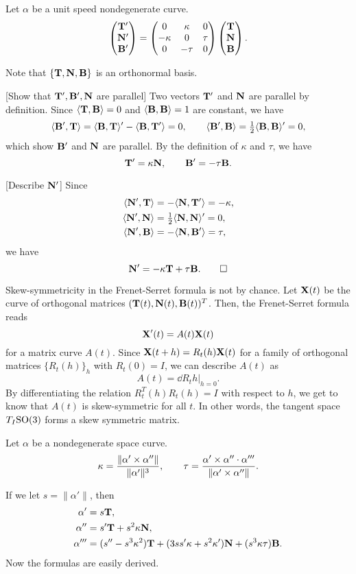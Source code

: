 \documentclass{../exp}
\def\a{\alpha}
\begin{document}
\begin{thm}
Let $\a$ be a unit speed nondegenerate curve.
\[\begin{pmatrix}\mathbf{T}'\\\mathbf{N}'\\\mathbf{B}'\end{pmatrix}=\begin{pmatrix}0&\kappa&0\\-\kappa&0&\tau\\0&-\tau&0\end{pmatrix}\begin{pmatrix}\mathbf{T}\\\mathbf{N}\\\mathbf{B}\end{pmatrix}.\]
\end{thm}
\begin{pf}
Note that $\{\mathbf{T},\mathbf{N},\mathbf{B}\}$ is an orthonormal basis.

[Show that $\mathbf{T}',\mathbf{B}',\mathbf{N}$ are parallel]
Two vectors $\mathbf{T}'$ and $\mathbf{N}$ are parallel by definition.
Since $\langle\mathbf{T},\mathbf{B}\rangle=0$ and $\langle\mathbf{B},\mathbf{B}\rangle=1$ are constant, we have
\[\langle\mathbf{B}',\mathbf{T}\rangle=\langle\mathbf{B},\mathbf{T}\rangle'-\langle\mathbf{B},\mathbf{T}'\rangle=0,\qquad\langle\mathbf{B}',\mathbf{B}\rangle=\tfrac12\langle\mathbf{B},\mathbf{B}\rangle'=0,\]
which show $\mathbf{B}'$ and $\mathbf{N}$ are parallel.
By the definition of $\kappa$ and $\tau$, we have
\[\mathbf{T}'=\kappa\mathbf{N},\qquad\mathbf{B}'=-\tau\mathbf{B}.\]

[Describe $\mathbf{N}'$]
Since
\begin{align*}
\langle\mathbf{N}',\mathbf{T}\rangle&=-\langle\mathbf{N},\mathbf{T}'\rangle=-\kappa,\\
\langle\mathbf{N}',\mathbf{N}\rangle&=\tfrac12\langle\mathbf{N},\mathbf{N}\rangle'=0,\\
\langle\mathbf{N}',\mathbf{B}\rangle&=-\langle\mathbf{N},\mathbf{B}'\rangle=\tau,
\end{align*}
we have
\[\mathbf{N}'=-\kappa\mathbf{T}+\tau\mathbf{B}.\qedhere\]
\end{pf}
\begin{rmk}
Skew-symmetricity in the Frenet-Serret formula is not by chance.
Let $\mathbf{X}(t)$ be the curve of orthogonal matrices $(\mathbf{T}(t),\mathbf{N}(t),\mathbf{B}(t))^T$.
Then, the Frenet-Serret formula reads
\[\mathbf{X}'(t)=A(t)\mathbf{X}(t)\]
for a matrix curve $A(t)$.
Since $\mathbf{X}(t+h)=R_t(h)\mathbf{X}(t)$ for a family of orthogonal matrices $\{R_t(h)\}_h$ with $R_t(0)=I$, we can describe $A(t)$ as 
\[A(t)=\left.\dd{R_t}{h}\right\rvert_{h=0}.\]
By differentiating the relation $R_t^T(h)R_t(h)=I$ with respect to $h$, we get to know that $A(t)$ is skew-symmetric for all $t$.
In other words, the tangent space $T_I\mathrm{SO}(3)$ forms a skew symmetric matrix.
\end{rmk}

\begin{prop}
Let $\a$ be a nondegenerate space curve.
\[\kappa=\frac{\|\a'\x\a''\|}{\|\a'\|^3},\qquad\tau=\frac{\a'\x\a''\cdot\a'''}{\|\a'\x\a''\|}.\]
\end{prop}
\begin{pf}
If we let $s=\|\a'\|$, then
\begin{align*}
\a'&=s\bT,\\
\a''&=s'\bT+s^2\kappa\bN,\\
\a'''&=(s''-s^3\kappa^2)\bT+(3ss'\kappa+s^2\kappa')\bN+(s^3\kappa\tau)\bB.
\end{align*}
Now the formulas are easily derived.
\end{pf}
\end{document}
